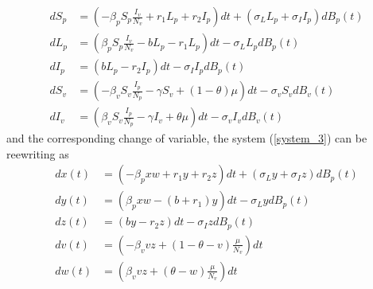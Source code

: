 \begin{equation}\label{system_3}
	\begin{aligned}
		d S_p &=
			\left(-\beta_p S_p \frac{I_v}{N_v} + r_1 L_p + r_2 I_p\right)dt + (\sigma_L L_p + \sigma_I I_p)dB_p(t) \\
		dL_p &=
			\left(\beta_p S_p \frac{I_v}{N_v} - b L_p - r_1 L_p\right)dt - \sigma_L L_p dB_p(t) \\
		d I_p &=
			\left(b L_p - r_2 I_p\right)dt -\sigma_I I_p dB_p(t) \\
		dS_v &=
			\left(-\beta_v S_v \frac{I_p}{N_p} -\gamma S_v +(1-\theta) \mu\right)dt - \sigma_v S_v dB_v(t) \\
		d I_v &=
			\left(\beta_v S_v \frac{I_p}{N_p} -\gamma I_v + \theta \mu\right)dt - \sigma_v I_v dB_v(t)
	\end{aligned}
\end{equation}
and the corresponding change of variable, the system (\ref{system_3}) can be reewriting as
\begin{equation}\label{system_4}
	\begin{aligned}
		d x(t) &=
			(-\beta_p x w + r_1 y + r_2 z)dt +(\sigma_L y + \sigma_I z)dB_p(t) \\
		dy(t) &=
			(\beta_p x w - (b + r_1) y)dt - \sigma_L y dB_p(t)\\
		dz(t) &=
			(b y - r_2 z)dt -\sigma_I z dB_p(t)\\
		dv(t) &=
			\left(-\beta_v v z  +(1-\theta-v)\frac{\mu}{N_v}\right)dt \\
		dw(t) &=
			\left(\beta_v v z + (\theta-w) \frac{\mu}{N_v}\right)dt
	\end{aligned}
\end{equation}























